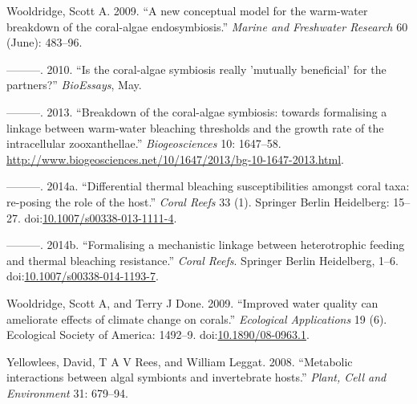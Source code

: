 \documentclass[]{elsarticle} %
\begin{document}
\hypertarget{ref-Wooldridge:2009p7807}{}
Wooldridge, Scott A. 2009. ``A new conceptual model for the warm-water
breakdown of the coral-algae endosymbiosis.'' \emph{Marine and
Freshwater Research} 60 (June): 483--96.

\hypertarget{ref-Wooldridge:2010p7809}{}
---------. 2010. ``Is the coral-algae symbiosis really 'mutually
beneficial' for the partners?'' \emph{BioEssays}, May.

\hypertarget{ref-Wooldridge:2013tj}{}
---------. 2013. ``Breakdown of the coral-algae symbiosis: towards
formalising a linkage between warm-water bleaching thresholds and the
growth rate of the intracellular zooxanthellae.'' \emph{Biogeosciences}
10: 1647--58.
\url{http://www.biogeosciences.net/10/1647/2013/bg-10-1647-2013.html}.

\hypertarget{ref-Wooldridge:2014di}{}
---------. 2014a. ``Differential thermal bleaching susceptibilities
amongst coral taxa: re-posing the role of the host.'' \emph{Coral Reefs}
33 (1). Springer Berlin Heidelberg: 15--27.
doi:\href{https://doi.org/10.1007/s00338-013-1111-4}{10.1007/s00338-013-1111-4}.

\hypertarget{ref-Wooldridge:2014hc}{}
---------. 2014b. ``Formalising a mechanistic linkage between
heterotrophic feeding and thermal bleaching resistance.'' \emph{Coral
Reefs}. Springer Berlin Heidelberg, 1--6.
doi:\href{https://doi.org/10.1007/s00338-014-1193-7}{10.1007/s00338-014-1193-7}.

\hypertarget{ref-Wooldridge:2009kb}{}
Wooldridge, Scott A, and Terry J Done. 2009. ``Improved water quality
can ameliorate effects of climate change on corals.'' \emph{Ecological
Applications} 19 (6). Ecological Society of America: 1492--9.
doi:\href{https://doi.org/10.1890/08-0963.1}{10.1890/08-0963.1}.

\hypertarget{ref-Yellowlees:2008p331}{}
Yellowlees, David, T A V Rees, and William Leggat. 2008. ``Metabolic
interactions between algal symbionts and invertebrate hosts.''
\emph{Plant, Cell and Environment} 31: 679--94.
\end{document}
